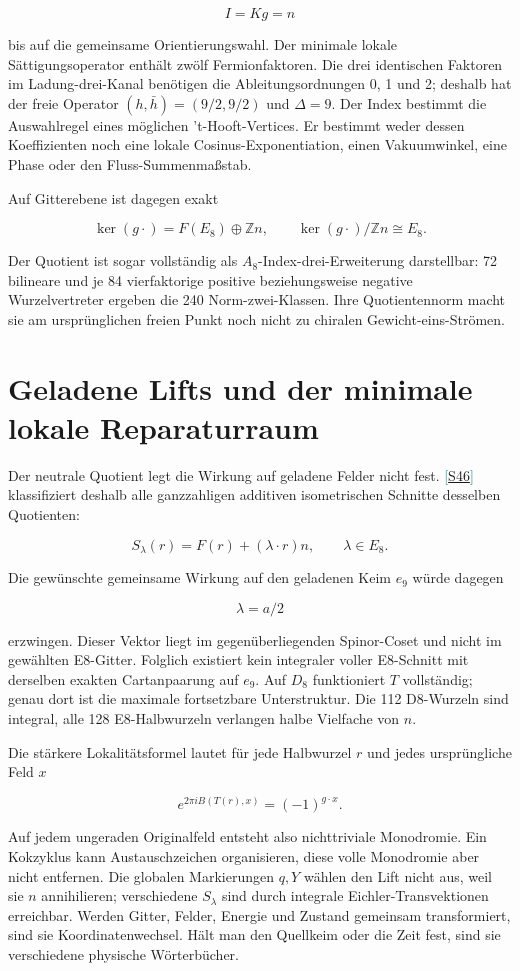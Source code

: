 \documentclass[11pt,a4paper,oneside,parskip=half,headings=normal,numbers=noenddot,bibliography=totoc]{scrreprt}
\newcommand{\src}[1]{\textcolor{teal}{\small[\hyperref[s:#1]{S#1}]}}
\begin{document}
\[
I=Kg=n
\]

bis auf die gemeinsame Orientierungswahl. Der minimale lokale Sättigungsoperator enthält zwölf Fermionfaktoren. Die drei identischen Faktoren im Ladung-drei-Kanal benötigen die Ableitungsordnungen 0, 1 und 2; deshalb hat der freie Operator \((h,\bar h)=(9/2,9/2)\) und \(\Delta=9\). Der Index bestimmt die Auswahlregel eines möglichen 't-Hooft-Vertices. Er bestimmt weder dessen Koeffizienten noch eine lokale Cosinus-Exponentiation, einen Vakuumwinkel, eine Phase oder den Fluss-Summenmaßstab.

Auf Gitterebene ist dagegen exakt

\[
\ker(g\cdot)=F(E_8)\oplus\mathbb Zn,\qquad
\ker(g\cdot)/\mathbb Zn\cong E_8.
\]

Der Quotient ist sogar vollständig als \(A_8\)-Index-drei-Erweiterung darstellbar: 72 bilineare und je 84 vierfaktorige positive beziehungsweise negative Wurzelvertreter ergeben die 240 Norm-zwei-Klassen. Ihre Quotientennorm macht sie am ursprünglichen freien Punkt noch nicht zu chiralen Gewicht-eins-Strömen.

\section{Geladene Lifts und der minimale lokale Reparaturraum}

Der neutrale Quotient legt die Wirkung auf geladene Felder nicht fest. \src{46} klassifiziert deshalb alle ganzzahligen additiven isometrischen Schnitte desselben Quotienten:

\[
S_\lambda(r)=F(r)+(\lambda\cdot r)n,\qquad \lambda\in E_8.
\]

Die gewünschte gemeinsame Wirkung auf den geladenen Keim \(e_9\) würde dagegen

\[
\lambda=a/2
\]

erzwingen. Dieser Vektor liegt im gegenüberliegenden Spinor-Coset und nicht im gewählten E8-Gitter. Folglich existiert kein integraler voller E8-Schnitt mit derselben exakten Cartanpaarung auf \(e_9\). Auf \(D_8\) funktioniert \(T\) vollständig; genau dort ist die maximale fortsetzbare Unterstruktur. Die 112 D8-Wurzeln sind integral, alle 128 E8-Halbwurzeln verlangen halbe Vielfache von \(n\).

Die stärkere Lokalitätsformel lautet für jede Halbwurzel \(r\) und jedes ursprüngliche Feld \(x\)

\[
e^{2\pi iB(T(r),x)}=(-1)^{g\cdot x}.
\]

Auf jedem ungeraden Originalfeld entsteht also nichttriviale Monodromie. Ein Kokzyklus kann Austauschzeichen organisieren, diese volle Monodromie aber nicht entfernen. Die globalen Markierungen \(q,Y\) wählen den Lift nicht aus, weil sie \(n\) annihilieren; verschiedene \(S_\lambda\) sind durch integrale Eichler-Transvektionen erreichbar. Werden Gitter, Felder, Energie und Zustand gemeinsam transformiert, sind sie Koordinatenwechsel. Hält man den Quellkeim oder die Zeit fest, sind sie verschiedene physische Wörterbücher.
\end{document}
